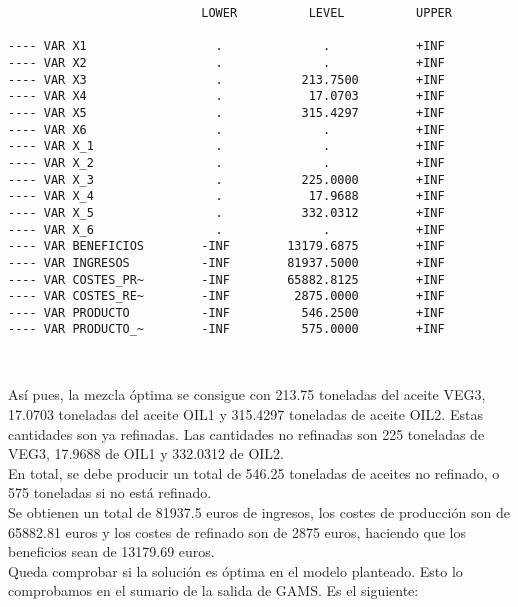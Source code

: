 \documentclass[12pt,a4paper,twoside,openright,titlepage,final]{article}
\begin{document}
\begin{verbatim}
                           LOWER          LEVEL          UPPER        

---- VAR X1                  .              .            +INF        
---- VAR X2                  .              .            +INF        
---- VAR X3                  .           213.7500        +INF         
---- VAR X4                  .            17.0703        +INF           
---- VAR X5                  .           315.4297        +INF             
---- VAR X6                  .              .            +INF         
---- VAR X_1                 .              .            +INF         
---- VAR X_2                 .              .            +INF             
---- VAR X_3                 .           225.0000        +INF       
---- VAR X_4                 .            17.9688        +INF          
---- VAR X_5                 .           332.0312        +INF      
---- VAR X_6                 .              .            +INF           
---- VAR BENEFICIOS        -INF        13179.6875        +INF           
---- VAR INGRESOS          -INF        81937.5000        +INF         
---- VAR COSTES_PR~        -INF        65882.8125        +INF           
---- VAR COSTES_RE~        -INF         2875.0000        +INF          
---- VAR PRODUCTO          -INF          546.2500        +INF    
---- VAR PRODUCTO_~        -INF          575.0000        +INF          

     
\end{verbatim}

Así pues, la mezcla óptima se consigue con 213.75 toneladas del aceite VEG3, 17.0703 toneladas del aceite OIL1 y 315.4297 toneladas de aceite OIL2. Estas cantidades son ya refinadas. Las cantidades no refinadas son 225 toneladas de VEG3, 17.9688 de OIL1 y 332.0312 de OIL2.\\

En total, se debe producir un total de 546.25 toneladas de aceites no refinado, o 575 toneladas si no está refinado.\\

Se obtienen un total de 81937.5 euros de ingresos, los costes de producción son de 65882.81 euros y los costes de refinado son de 2875 euros, haciendo que los beneficios sean de 13179.69 euros.\\

Queda comprobar si la solución es óptima en el modelo planteado. Esto lo comprobamos en el sumario de la salida de GAMS. Es el siguiente:
\end{document}
